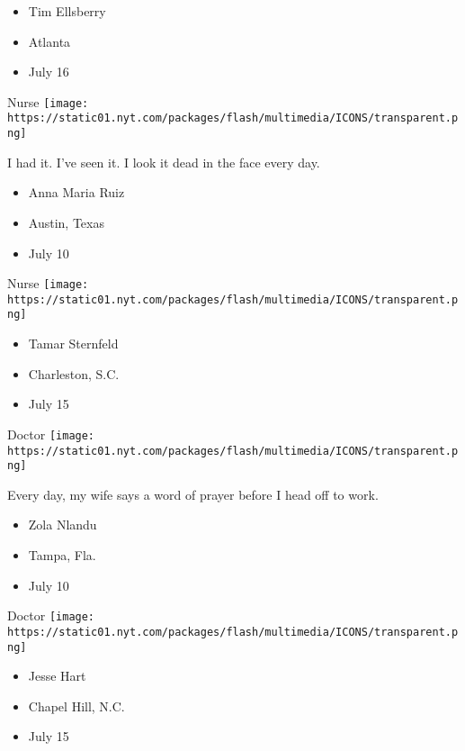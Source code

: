 \begin{itemize}
\tightlist
\item
  Tim Ellsberry
\item
  Atlanta
\item
  July 16
\end{itemize}

\protect\hyperlink{item-anna-maria-ruiz}{}

Nurse
\texttt{[image: https://static01.nyt.com/packages/flash/multimedia/ICONS/transparent.png]}

I had it. I've seen it. I look it dead in the face every day.

\begin{itemize}
\tightlist
\item
  Anna Maria Ruiz
\item
  Austin, Texas
\item
  July 10
\end{itemize}

\protect\hyperlink{item-tamar-sternfeld}{}

Nurse
\texttt{[image: https://static01.nyt.com/packages/flash/multimedia/ICONS/transparent.png]}

\begin{itemize}
\tightlist
\item
  Tamar Sternfeld
\item
  Charleston, S.C.
\item
  July 15
\end{itemize}

\protect\hyperlink{item-zola-nlandu}{}

Doctor
\texttt{[image: https://static01.nyt.com/packages/flash/multimedia/ICONS/transparent.png]}

Every day, my wife says a word of prayer before I head off to work.

\begin{itemize}
\tightlist
\item
  Zola Nlandu
\item
  Tampa, Fla.
\item
  July 10
\end{itemize}

\protect\hyperlink{item-jesse-hart}{}

Doctor
\texttt{[image: https://static01.nyt.com/packages/flash/multimedia/ICONS/transparent.png]}

\begin{itemize}
\tightlist
\item
  Jesse Hart
\item
  Chapel Hill, N.C.
\item
  July 15
\end{itemize}

